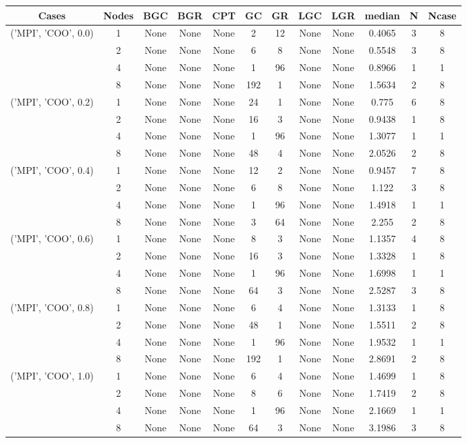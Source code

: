 \begin{tabular}{cccccccccccc}
\hline
Cases & Nodes& BGC& BGR& CPT& GC& GR& LGC& LGR& median & N & Ncase \\
\hline
\multirow{4}{*}{('MPI', 'COO', 0.0)}& 1& None& None& None& 2& 12& None& None& 0.4065& 3& 8\\
& 2& None& None& None& 6& 8& None& None& 0.5548& 3& 8\\
& 4& None& None& None& 1& 96& None& None& 0.8966& 1& 1\\
& 8& None& None& None& 192& 1& None& None& 1.5634& 2& 8\\
\hline
\multirow{4}{*}{('MPI', 'COO', 0.2)}& 1& None& None& None& 24& 1& None& None& 0.775& 6& 8\\
& 2& None& None& None& 16& 3& None& None& 0.9438& 1& 8\\
& 4& None& None& None& 1& 96& None& None& 1.3077& 1& 1\\
& 8& None& None& None& 48& 4& None& None& 2.0526& 2& 8\\
\hline
\multirow{4}{*}{('MPI', 'COO', 0.4)}& 1& None& None& None& 12& 2& None& None& 0.9457& 7& 8\\
& 2& None& None& None& 6& 8& None& None& 1.122& 3& 8\\
& 4& None& None& None& 1& 96& None& None& 1.4918& 1& 1\\
& 8& None& None& None& 3& 64& None& None& 2.255& 2& 8\\
\hline
\multirow{4}{*}{('MPI', 'COO', 0.6)}& 1& None& None& None& 8& 3& None& None& 1.1357& 4& 8\\
& 2& None& None& None& 16& 3& None& None& 1.3328& 1& 8\\
& 4& None& None& None& 1& 96& None& None& 1.6998& 1& 1\\
& 8& None& None& None& 64& 3& None& None& 2.5287& 3& 8\\
\hline
\multirow{4}{*}{('MPI', 'COO', 0.8)}& 1& None& None& None& 6& 4& None& None& 1.3133& 1& 8\\
& 2& None& None& None& 48& 1& None& None& 1.5511& 2& 8\\
& 4& None& None& None& 1& 96& None& None& 1.9532& 1& 1\\
& 8& None& None& None& 192& 1& None& None& 2.8691& 2& 8\\
\hline
\multirow{4}{*}{('MPI', 'COO', 1.0)}& 1& None& None& None& 6& 4& None& None& 1.4699& 1& 8\\
& 2& None& None& None& 8& 6& None& None& 1.7419& 2& 8\\
& 4& None& None& None& 1& 96& None& None& 2.1669& 1& 1\\
& 8& None& None& None& 64& 3& None& None& 3.1986& 3& 8\\
\hline
\end{tabular}
